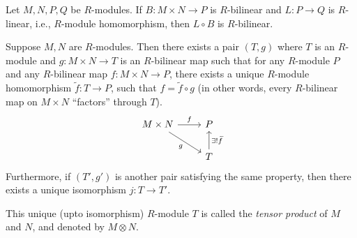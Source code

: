 \begin{lemma}
    Let \( M, N, P, Q \) be  \( R \)-modules. If \( B: M \times N \to P \) is  \( R \)-bilinear and \( L: P \to Q \) is  \( R \)-linear, i.e., \( R \)-module homomorphism, then  \( L \circ B \) is  \( R \)-bilinear.
\end{lemma}
\begin{proposition}
    Suppose \( M, N\) are  \(R\)-modules. Then there exists a pair  \( (T, g) \) where  \( T \) is an  \( R \)-module  and \( g: M \times N \to T\) is an \( R \)-bilinear map such that for any \( R \)-module  \( P \) and any \( R \)-bilinear map  \( f: M \times N \to P\), there exists a unique \( R \)-module homomorphism \( \widetilde{f}: T \to P \), such that \( f = \widetilde{f} \circ g \) (in other words, every \( R \)-bilinear map on  \( M \times N \) ``factors'' through \( T \)).
\[\begin{tikzcd}
	{M \times N} & P \\
	& T
	\arrow["f", from=1-1, to=1-2]
	\arrow["g"', from=1-1, to=2-2]
	\arrow["{\exists!\widetilde{f}}"', from=2-2, to=1-2]
\end{tikzcd}\]
Furthermore, if \( (T', g') \) is another pair satisfying the same property, then there exists a unique isomorphism  \( j: T \to T' \).
\end{proposition}
This unique (upto isomorphism) \( R \)-module \( T \) is called the \textit{tensor product} of  \( M \) and  \( N \), and denoted by \( M \otimes N \).
